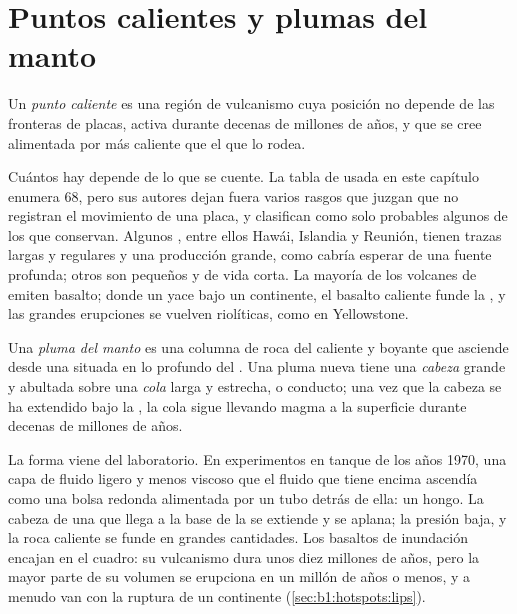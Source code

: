 \section{Puntos calientes y plumas del manto}\label{sec:b1:hotspots:plumes}

\begin{definition}\label{def:b1:hotspots:hotspot}
Un \emph{punto caliente} es una región de vulcanismo cuya posición no depende de las fronteras de placas, activa durante
decenas de millones de años, y que se cree alimentada por  más caliente que el que lo rodea.
\end{definition}

Cuántos  hay depende de lo que se cuente. La tabla de  usada en este capítulo enumera 68, pero sus autores dejan
fuera varios rasgos que juzgan que no registran el movimiento de una placa, y clasifican como solo probables algunos de los que conservan. Algunos
, entre ellos Hawái, Islandia y Reunión, tienen trazas largas y regulares y una producción grande, como cabría esperar de una fuente
profunda; otros son pequeños y de vida corta. La mayoría de los volcanes de  emiten basalto; donde un  yace bajo un
continente, el basalto caliente funde la , y las grandes erupciones se vuelven riolíticas, como en Yellowstone.

\begin{definition}\label{def:b1:hotspots:plume}
Una \emph{pluma del manto} es una columna de roca del  caliente y boyante que asciende desde una 
situada en lo profundo del . Una pluma nueva tiene una \emph{cabeza} grande y abultada sobre una \emph{cola} larga y estrecha, o conducto; una
vez que la cabeza se ha extendido bajo la , la cola sigue llevando magma a la superficie durante decenas de millones de años.
\end{definition}

La forma viene del laboratorio. En experimentos en tanque de los años 1970, una capa de fluido ligero y menos viscoso que el fluido que tiene
encima ascendía como una bolsa redonda alimentada por un tubo detrás de ella: un hongo. La cabeza de una  que llega a la base de la
 se extiende y se aplana; la presión baja, y la roca caliente se funde en grandes cantidades. Los basaltos de inundación encajan en el
cuadro: su vulcanismo dura unos diez millones de años, pero la mayor parte de su volumen se erupciona en un millón de años o menos, y a menudo van
con la ruptura de un continente (\cref{sec:b1:hotspots:lips}).

